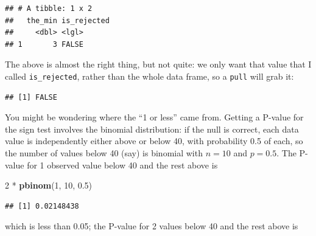 \documentclass[]{tufte-book}
\newenvironment{Shaded}{}{}
\newcommand{\DataTypeTok}[1]{\textcolor[rgb]{0.56,0.13,0.00}{#1}}
\newcommand{\DecValTok}[1]{\textcolor[rgb]{0.25,0.63,0.44}{#1}}
\newcommand{\FloatTok}[1]{\textcolor[rgb]{0.25,0.63,0.44}{#1}}
\newcommand{\KeywordTok}[1]{\textcolor[rgb]{0.00,0.44,0.13}{\textbf{#1}}}
\newcommand{\NormalTok}[1]{#1}
\newcommand{\OperatorTok}[1]{\textcolor[rgb]{0.40,0.40,0.40}{#1}}
\newcommand{\StringTok}[1]{\textcolor[rgb]{0.25,0.44,0.63}{#1}}
\theoremstyle{definition}
\theoremstyle{definition}
\theoremstyle{definition}
\theoremstyle{remark}
\begin{document}
\begin{verbatim}
## # A tibble: 1 x 2
##   the_min is_rejected
##     <dbl> <lgl>      
## 1       3 FALSE
\end{verbatim}

The above is almost the right thing, but not quite: we only want that
value that I called \texttt{is\_rejected}, rather than the whole data
frame, so a \texttt{pull} will grab it:

\begin{Shaded}
\end{Shaded}

\begin{verbatim}
## [1] FALSE
\end{verbatim}

You might be wondering where the ``1 or less'' came from. Getting a
P-value for the sign test involves the binomial distribution: if the
null is correct, each data value is independently either above or below
40, with probability 0.5 of each, so the number of values below 40 (say)
is binomial with \(n=10\) and \(p=0.5\). The P-value for 1 observed
value below 40 and the rest above is

\begin{Shaded}
\begin{Highlighting}[]
\DecValTok{2} \OperatorTok{*}\StringTok{ }\KeywordTok{pbinom}\NormalTok{(}\DecValTok{1}\NormalTok{, }\DecValTok{10}\NormalTok{, }\FloatTok{0.5}\NormalTok{)}
\end{Highlighting}
\end{Shaded}

\begin{verbatim}
## [1] 0.02148438
\end{verbatim}

which is less than 0.05; the P-value for 2 values below 40 and the rest
above is
\end{document}
